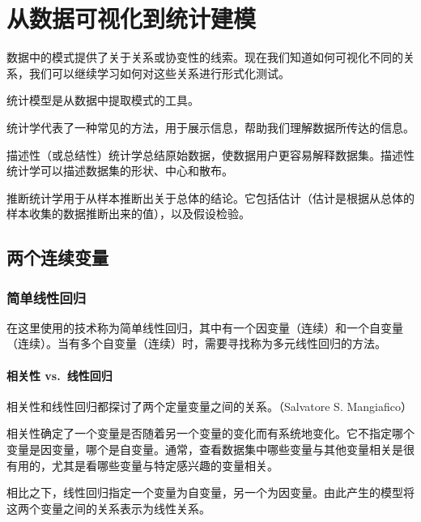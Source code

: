 \documentclass[]{book}
\let\oldparagraph\paragraph
\renewcommand{\paragraph}[1]{\oldparagraph{#1}\mbox{}}
\begin{document}
\hypertarget{ux4eceux6570ux636eux53efux89c6ux5316ux5230ux7edfux8ba1ux5efaux6a21}{%
\section{从数据可视化到统计建模}\label{ux4eceux6570ux636eux53efux89c6ux5316ux5230ux7edfux8ba1ux5efaux6a21}}

数据中的模式提供了关于关系或协变性的线索。现在我们知道如何可视化不同的关系，我们可以继续学习如何对这些关系进行形式化测试。

统计模型是从数据中提取模式的工具。

统计学代表了一种常见的方法，用于展示信息，帮助我们理解数据所传达的信息。

描述性（或总结性）统计学总结原始数据，使数据用户更容易解释数据集。描述性统计学可以描述数据集的形状、中心和散布。

推断统计学用于从样本推断出关于总体的结论。它包括估计（估计是根据从总体的样本收集的数据推断出来的值），以及假设检验。

\hypertarget{ux4e24ux4e2aux8fdeux7eedux53d8ux91cf-1}{%
\subsection{两个连续变量}\label{ux4e24ux4e2aux8fdeux7eedux53d8ux91cf-1}}

\hypertarget{ux7b80ux5355ux7ebfux6027ux56deux5f52}{%
\subsubsection{简单线性回归}\label{ux7b80ux5355ux7ebfux6027ux56deux5f52}}

在这里使用的技术称为简单线性回归，其中有一个因变量（连续）和一个自变量（连续）。当有多个自变量（连续）时，需要寻找称为多元线性回归的方法。

\hypertarget{ux76f8ux5173ux6027-vs.ux7ebfux6027ux56deux5f52}{%
\paragraph{相关性 vs.~线性回归}\label{ux76f8ux5173ux6027-vs.ux7ebfux6027ux56deux5f52}}

相关性和线性回归都探讨了两个定量变量之间的关系。（Salvatore S. Mangiafico）

相关性确定了一个变量是否随着另一个变量的变化而有系统地变化。它不指定哪个变量是因变量，哪个是自变量。通常，查看数据集中哪些变量与其他变量相关是很有用的，尤其是看哪些变量与特定感兴趣的变量相关。

相比之下，线性回归指定一个变量为自变量，另一个为因变量。由此产生的模型将这两个变量之间的关系表示为线性关系。
\end{document}
